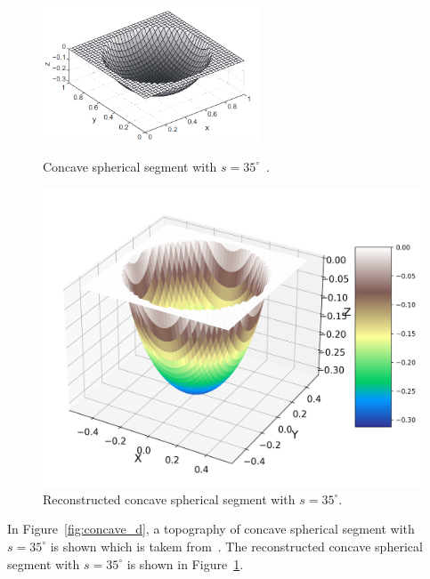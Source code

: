 \documentclass{optica-article}
\begin{document}
\begin{figure}[ht]
    \centering
	\hspace{-1cm}
    \begin{minipage}{0.45\textwidth}
        \centering
        \includegraphics[width=\textwidth, height = 4cm]{./Figures/concave_d.png} 
        \caption{Concave spherical segment with $s=35^\circ$~\cite{DAVIDSSON20151}.}
        \label{fig:concave_d}
    \end{minipage}\hfill
	\hspace{-0.8cm}
    \begin{minipage}{0.45\textwidth}
        \centering
        \includegraphics[width=\textwidth]{./Figures/concave.png} 
        \caption{Reconstructed concave spherical segment with $s = 35^\circ$.}
        \label{fig:concave}
    \end{minipage}
\end{figure}

In Figure~\ref{fig:concave_d}, a topography of concave spherical segment with $s = 35^\circ$ is shown which is 
takem from~\cite{DAVIDSSON20151}. The reconstructed concave spherical 
segment with $s = 35^\circ$ is shown in Figure~\ref{fig:concave}.
\end{document}

